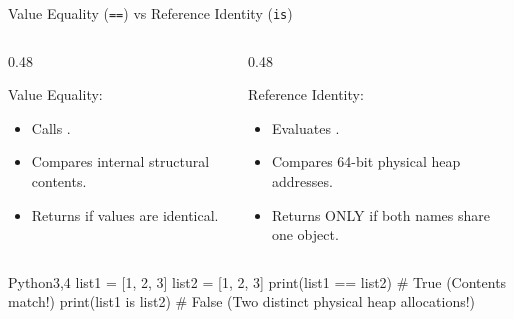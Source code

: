 \begin{frame}[fragile]{Value Equality (\texttt{==}) vs Reference Identity (\texttt{is})}
  \begin{columns}[T,onlytextwidth]
    \begin{column}{0.48\textwidth}
      \begin{ConceptBox}{Value Equality: }
        \begin{itemize}
          \item Calls .
          \item Compares internal structural contents.
          \item Returns  if values are identical.
        \end{itemize}
      \end{ConceptBox}
    \end{column}
    \begin{column}{0.48\textwidth}
      \begin{ConceptBox}{Reference Identity: }
        \begin{itemize}
          \item Evaluates .
          \item Compares 64-bit physical heap addresses.
          \item Returns  ONLY if both names share one object.
        \end{itemize}
      \end{ConceptBox}
    \end{column}
  \end{columns}
  \vspace{0.15cm}
  \begin{HighlightedCodeBlock}{Python}{3,4}
list1 = [1, 2, 3]
list2 = [1, 2, 3]
print(list1 == list2)  # True  (Contents match!)
print(list1 is list2)  # False (Two distinct physical heap allocations!)
  \end{HighlightedCodeBlock}
\end{frame}

